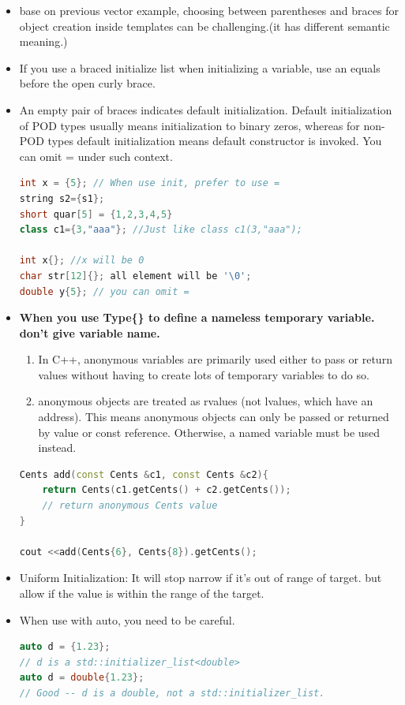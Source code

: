 \documentclass[a4paper,12pt,twoside]{book}
\begin{document}
\begin{itemize}
\item base on previous vector example, choosing between parentheses and braces for object creation inside templates can be challenging.(it has different semantic meaning.)

\item If you use a braced initialize list when initializing a variable, use an equals before the open curly brace.

\item An empty pair of braces indicates default initialization. Default initialization of POD types usually means initialization to binary zeros, whereas for non-POD types default initialization means default constructor is invoked. You can omit = under such context.

\begin{lstlisting}[frame=single, language=c++]
int x = {5}; // When use init, prefer to use =
string s2={s1};
short quar[5] = {1,2,3,4,5}
class c1={3,"aaa"}; //Just like class c1(3,"aaa");

int x{}; //x will be 0
char str[12]{}; all element will be '\0';
double y{5}; // you can omit =
\end{lstlisting}


\item \textbf{When you use Type\{\} to define a nameless temporary variable.  don't give variable name.}
\begin{enumerate}
\item In C++, anonymous variables are primarily used either to pass or return values without having to create lots of temporary variables to do so.
\item anonymous objects are treated as rvalues (not lvalues, which have an address). This means anonymous objects can only be passed or returned by value or const reference. Otherwise, a named variable must be used instead.
\end{enumerate}

\begin{lstlisting}[frame=single, language=c++]
Cents add(const Cents &c1, const Cents &c2){
    return Cents(c1.getCents() + c2.getCents());
    // return anonymous Cents value
}

cout <<add(Cents{6}, Cents{8}).getCents();
\end{lstlisting}

\item Uniform Initialization: It will stop narrow if it's out of range of target. but allow if the value is within the range of the target.


\item When use with auto, you need to be careful.
\begin{lstlisting}[frame=single, language=c++]
auto d = {1.23};
// d is a std::initializer_list<double>
auto d = double{1.23};
// Good -- d is a double, not a std::initializer_list.
\end{lstlisting}

\end{itemize}
\end{document}
